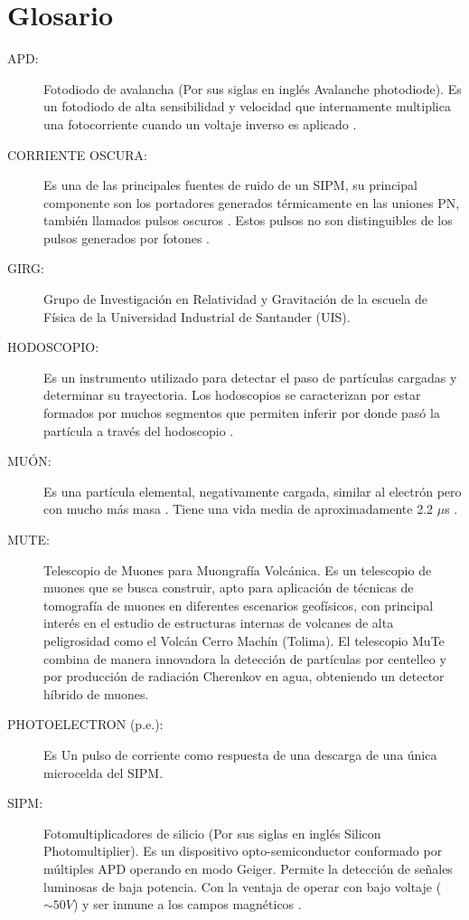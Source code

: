 \documentclass[11pt,letterpaper,oneside]{book}
\begin{document}
\chapter*{Glosario}
\begin{description}
	\item[APD:] Fotodiodo de avalancha (Por sus siglas en inglés Avalanche photodiode). Es un fotodiodo de alta sensibilidad y velocidad que internamente multiplica una fotocorriente cuando un voltaje inverso es aplicado \cite{Apd_Hamamatsu}. 
    
    \item[CORRIENTE OSCURA:] Es una de las principales fuentes de ruido de un SIPM, su principal componente son los portadores generados térmicamente en las uniones PN, también llamados pulsos oscuros \cite{Intro_SIPM_Sensl}. Estos pulsos no son distinguibles de los pulsos generados por fotones \cite{Apd_Hamamatsu}.      
	
    \item[GIRG:] Grupo de Investigación en Relatividad y Gravitación de  la escuela de Física de la Universidad Industrial de Santander (UIS).   
	
    \item[HODOSCOPIO:] Es un instrumento utilizado para detectar el paso de partículas cargadas y determinar su trayectoria. Los hodoscopios se caracterizan por estar formados por muchos segmentos que permiten inferir por donde pasó la partícula a través del hodoscopio \cite{Hodoscope}.     
	
    \item[MUÓN:] Es una partícula elemental, negativamente cargada, similar al electrón pero con mucho más masa \cite{Muon_wiki}. Tiene una vida media de aproximadamente 2.2 $\mu$s \cite{muon}.
    
	\item[MUTE:] Telescopio de Muones para Muongrafía Volcánica. Es un telescopio de muones que se busca construir, apto para aplicación de técnicas de tomografía de muones en diferentes escenarios geofísicos, con principal interés en el estudio de estructuras internas de volcanes de alta peligrosidad como el Volcán Cerro Machín (Tolima). El telescopio MuTe combina de manera innovadora la detección de partículas por centelleo y por producción de radiación Cherenkov en agua, obteniendo un detector híbrido de muones.           

	\item[PHOTOELECTRON (p.e.):] Es Un pulso de corriente como respuesta de una descarga de una única microcelda del SIPM.    
       
	\item[SIPM:] Fotomultiplicadores de silicio (Por sus siglas en inglés Silicon Photomultiplier). Es un dispositivo opto-semiconductor conformado por múltiples APD operando en modo Geiger. Permite la detección de señales luminosas de baja potencia. Con la ventaja de operar con bajo voltaje ($\sim 50V$) y ser inmune a los campos magnéticos \cite{Intro_SIPM_Sensl}.   

\end{description}
\end{document}
